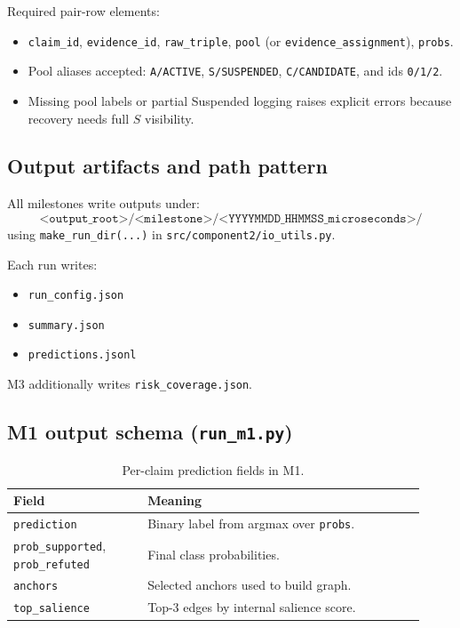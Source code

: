 Required pair-row elements:
\begin{itemize}
\item \texttt{claim\_id}, \texttt{evidence\_id}, \texttt{raw\_triple}, \texttt{pool} (or \texttt{evidence\_assignment}), \texttt{probs}.
\item Pool aliases accepted: \texttt{A/ACTIVE}, \texttt{S/SUSPENDED}, \texttt{C/CANDIDATE}, and ids \texttt{0/1/2}.
\item Missing pool labels or partial Suspended logging raises explicit errors because recovery needs full $S$ visibility.
\end{itemize}

\subsection{Output artifacts and path pattern}
All milestones write outputs under:
\[
\texttt{<output\_root>/<milestone>/<YYYYMMDD\_HHMMSS\_microseconds>/}
\]
using \texttt{make\_run\_dir(...)} in \texttt{src/component2/io\_utils.py}.

Each run writes:
\begin{itemize}
\item \texttt{run\_config.json}
\item \texttt{summary.json}
\item \texttt{predictions.jsonl}
\end{itemize}
M3 additionally writes \texttt{risk\_coverage.json}.

\subsection{M1 output schema (\texttt{run\_m1.py})}
\begin{table}[H]
\centering
\begin{tabular}{@{}p{0.30\linewidth}p{0.62\linewidth}@{}}
\toprule
Field & Meaning \\
\midrule
\texttt{prediction} & Binary label from argmax over \texttt{probs}. \\
\texttt{prob\_supported}, \texttt{prob\_refuted} & Final class probabilities. \\
\texttt{anchors} & Selected anchors used to build graph. \\
\texttt{top\_salience} & Top-3 edges by internal salience score. \\
\bottomrule
\end{tabular}
\caption{Per-claim prediction fields in M1.}
\end{table}

